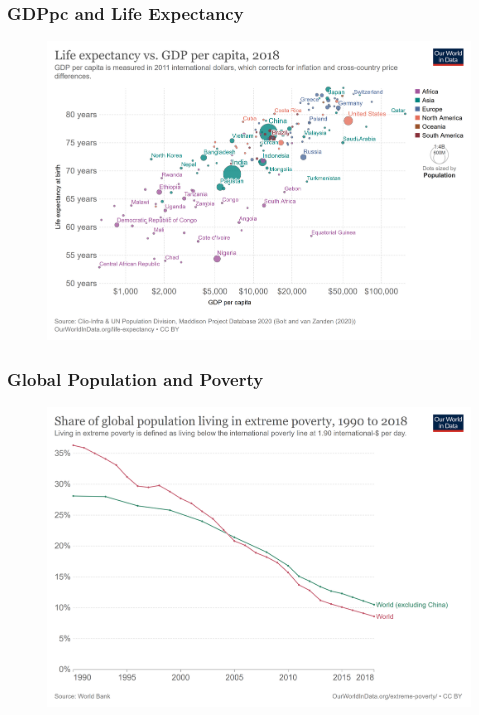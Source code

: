 \documentclass[handout]{beamer}
\begin{document}
\begin{frame} 
	\frametitle{\LARGE{GDPpc and Life Expectancy}}
	\begin{figure}[ht!]
		\centering
		\includegraphics[height=\textheight, keepaspectratio]{life-expectancy-vs-gdp-per-capita.png}
	\end{figure}
\end{frame}

\begin{frame} 
	\frametitle{\LARGE{Global Population and Poverty}}
	\begin{figure}[ht!]
		\centering
		\includegraphics[height=\textheight, keepaspectratio]{poverty-decline-without-china.png}
	\end{figure}
\end{frame}
\end{document}
